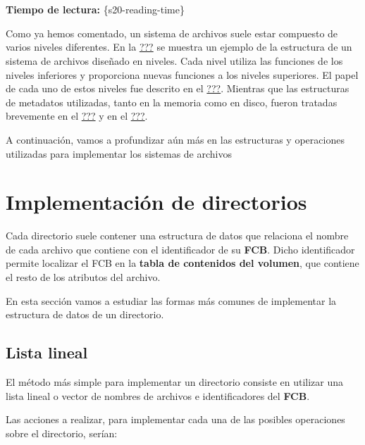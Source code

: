 \section{}

\textbf{Tiempo de lectura:} \{s20-reading-time\}

Como ya hemos comentado, un sistema de archivos suele estar compuesto de
varios niveles diferentes. En la
\hyperref[fig-estructura-sistema-de-archivos]{???} se muestra un ejemplo
de la estructura de un sistema de archivos diseñado en niveles. Cada
nivel utiliza las funciones de los niveles inferiores y proporciona
nuevas funciones a los niveles superiores. El papel de cada uno de estos
niveles fue descrito en el
\hyperref[_estructura_de_un_sistema_de_archivos]{???}. Mientras que las
estructuras de metadatos utilizadas, tanto en la memoria como en disco,
fueron tratadas brevemente en el
\hyperref[_estructuras_de_metadatos_en_disco]{???} y en el
\hyperref[_estructuras_de_metadatos_en_memoria]{???}.

A continuación, vamos a profundizar aún más en las estructuras y
operaciones utilizadas para implementar los sistemas de archivos

\section{Implementación de
directorios}\label{_implementaciuxf3n_de_directorios}

Cada directorio suele contener una estructura de datos que relaciona el
nombre de cada archivo que contiene con el identificador de su
\textbf{FCB}. Dicho identificador permite localizar el FCB en la
\textbf{tabla de contenidos del volumen}, que contiene el resto de los
atributos del archivo.

En esta sección vamos a estudiar las formas más comunes de implementar
la estructura de datos de un directorio.

\subsection{Lista lineal}\label{_lista_lineal}

El método más simple para implementar un directorio consiste en utilizar
una lista lineal o vector de nombres de archivos e identificadores del
\textbf{FCB}.

Las acciones a realizar, para implementar cada una de las posibles
operaciones sobre el directorio, serían:

